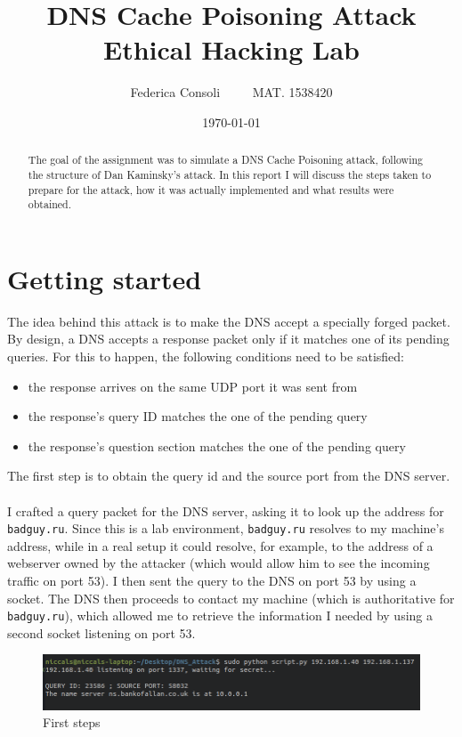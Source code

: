 \documentclass[a4paper]{article}
\title{%
	DNS Cache Poisoning Attack\\
	\large Ethical Hacking Lab}
\author{Federica Consoli $\; \; \; \; \; \; \;$ MAT. 1538420}
\date{\today}
\begin{document}
\maketitle

\begin{abstract}
	The goal of the assignment was to simulate a DNS Cache Poisoning attack, following the structure of Dan Kaminsky's attack. In this report I will discuss the steps taken to prepare for the attack, how it was actually implemented and what results were obtained.
\end{abstract}

\section{Getting started}
\label{sec:q1}
	The idea behind this attack is to make the DNS accept a specially forged packet. By design, a DNS accepts a response packet only if it matches one of its pending queries. For this to happen, the following conditions need to be satisfied:
	\begin{itemize}
		\item the response arrives on the same UDP port it was sent from
		\item the response's query ID matches the one of the pending query
		\item the response's question section matches the one of the pending query
	\end{itemize}
	The first step is to obtain the query id and the source port from the DNS server.
	\\\\
	I crafted a query packet for the DNS server, asking it to look up the address for \texttt{badguy.ru}. Since this is a lab environment, \texttt{badguy.ru} resolves to my machine's address, while in a real setup it could resolve, for example, to the address of a webserver owned by the attacker (which would allow him to see the incoming traffic on port 53). I then sent the query to the DNS on port 53 by using a socket. The DNS then proceeds to contact my machine (which is authoritative for \texttt{badguy.ru}), which allowed me to retrieve the information I needed by using a second socket listening on port 53.\\
	\begin{figure}[H]
		\centering
		\includegraphics[width=1\linewidth]{qid_srcport}
		\caption[]{First steps}
		\label{fig:qidsrcport}
	\end{figure}
\end{document}
